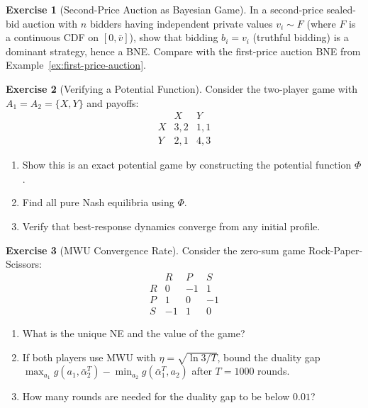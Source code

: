\documentclass[11pt,a4paper]{article}
\theoremstyle{definition}
\newtheorem{exercise}{Exercise}[section]
\theoremstyle{plain}
\theoremstyle{remark}
\begin{document}
\begin{exercise}[Second-Price Auction as Bayesian Game]
\label{ex:second-price}
In a second-price sealed-bid auction with $n$ bidders having independent private values
$v_i \sim F$ (where $F$ is a continuous CDF on $[0, \bar{v}]$), show that bidding
$b_i = v_i$ (truthful bidding) is a dominant strategy, hence a BNE. Compare with the
first-price auction BNE from Example~\ref{ex:first-price-auction}.
\end{exercise}

\begin{exercise}[Verifying a Potential Function]
\label{ex:verify-potential}
Consider the two-player game with $A_1 = A_2 = \{X, Y\}$ and payoffs:
\[
\begin{array}{c|cc}
  & X & Y \\ \hline
X & 3,2 & 1,1 \\
Y & 2,1 & 4,3
\end{array}
\]
\begin{enumerate}[label=(\alph*)]
    \item Show this is an exact potential game by constructing the potential function $\Phi$.
    \item Find all pure Nash equilibria using $\Phi$.
    \item Verify that best-response dynamics converge from any initial profile.
\end{enumerate}
\end{exercise}

\begin{exercise}[MWU Convergence Rate]
\label{ex:mwu-rate}
Consider the zero-sum game Rock-Paper-Scissors:
\[
\begin{array}{c|ccc}
  & R & P & S \\ \hline
R & 0 & -1 & 1 \\
P & 1 & 0 & -1 \\
S & -1 & 1 & 0
\end{array}
\]
\begin{enumerate}[label=(\alph*)]
    \item What is the unique NE and the value of the game?
    \item If both players use MWU with $\eta = \sqrt{\ln 3 / T}$, bound the duality gap
    $\max_{a_1} g(a_1, \bar{\alpha}_2^T) - \min_{a_2} g(\bar{\alpha}_1^T, a_2)$ after
    $T = 1000$ rounds.
    \item How many rounds are needed for the duality gap to be below $0.01$?
\end{enumerate}
\end{exercise}
\end{document}
